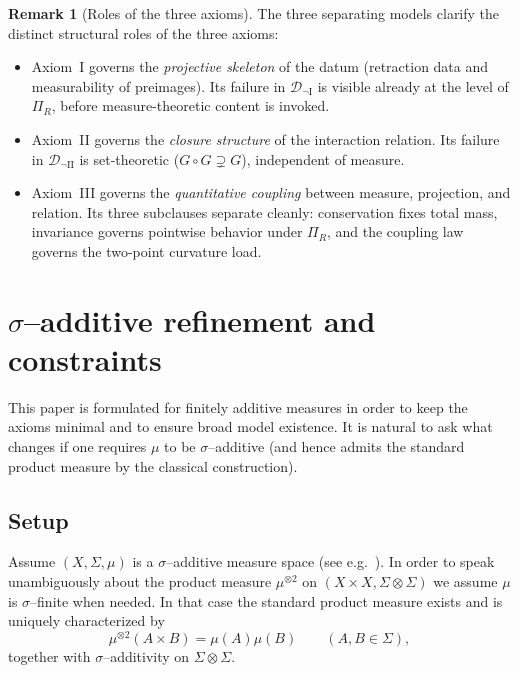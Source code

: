 \documentclass[11pt]{article}
\numberwithin{equation}{section}
\theoremstyle{definition}
\newtheorem{remark}[theorem]{Remark}
\begin{document}
\begin{remark}[Roles of the three axioms]\label{rem:roles}
The three separating models clarify the distinct structural roles of the three axioms:
\begin{itemize}[nosep]
\item Axiom~I governs the \emph{projective skeleton} of the datum (retraction data and measurability of preimages). Its failure in $\mathcal D_{\neg\mathrm{I}}$ is visible already at the level of $\Pi_R$, before measure-theoretic content is invoked.
\item Axiom~II governs the \emph{closure structure} of the interaction relation. Its failure in $\mathcal D_{\neg\mathrm{II}}$ is set-theoretic ($G\circ G\supsetneq G$), independent of measure.
\item Axiom~III governs the \emph{quantitative coupling} between measure, projection, and relation. Its three subclauses separate cleanly: conservation fixes total mass, invariance governs pointwise behavior under $\Pi_R$, and the coupling law governs the two-point curvature load.
\end{itemize}
\end{remark}


\section{\texorpdfstring{$\sigma$}{sigma}--additive refinement and constraints}\label{sec:sigma-additive}

This paper is formulated for finitely additive measures in order to keep the axioms minimal and
to ensure broad model existence. It is natural to ask what changes if one
requires $\mu$ to be $\sigma$--additive (and hence admits the standard product measure by the classical construction).

\subsection{Setup}
Assume $(X,\Sigma,\mu)$ is a $\sigma$--additive measure space (see e.g.\ \cite{Halmos,Bogachev}). In order to speak unambiguously about the product measure
$\mu^{\otimes2}$ on $(X\times X,\Sigma\otimes\Sigma)$ we assume $\mu$ is $\sigma$--finite when needed.
In that case the standard product measure exists and is uniquely characterized by
\[
\mu^{\otimes2}(A\times B)=\mu(A)\mu(B)\qquad(A,B\in\Sigma),
\]
together with $\sigma$--additivity on $\Sigma\otimes\Sigma$.
\end{document}
